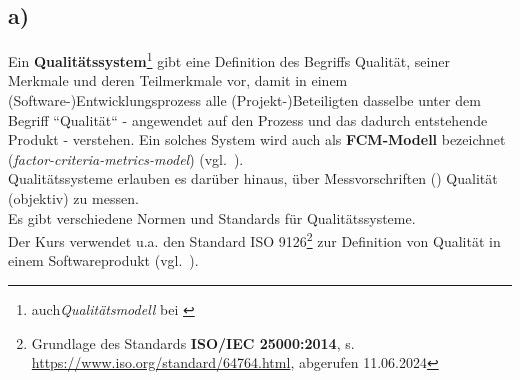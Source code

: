 \subsection*{a)}

Ein \textbf{Qualitätssystem}\footnote{
    auch\textit{Qualitätsmodell} bei \cite[461 ff.]{Bal08}
} gibt eine Definition des Begriffs Qualität, seiner Merkmale und deren Teilmerkmale vor, damit in einem (Software-)Entwicklungsprozess alle (Projekt-)Beteiligten dasselbe unter dem Begriff ``Qualität`` - angewendet auf den Prozess und das dadurch entstehende Produkt - verstehen. Ein solches System wird auch als \textbf{FCM-Modell} bezeichnet (\textit{factor-criteria-metrics-model}) (vgl.~\cite[462]{Bal08}).\\
Qualitätssysteme erlauben es darüber hinaus, über Messvorschriften () Qualität (objektiv) zu messen.\\

\noindent
Es gibt verschiedene Normen und Standards für Qualitätssysteme.\\
Der Kurs verwendet u.a. den Standard ISO 9126\footnote{
    Grundlage des Standards \textbf{ISO/IEC 25000:2014}, s. \url{https://www.iso.org/standard/64764.html}, abgerufen 11.06.2024
} zur Definition von Qualität in einem Softwareprodukt (vgl.~\cite[Abb. 1.2]{Wed09c}).